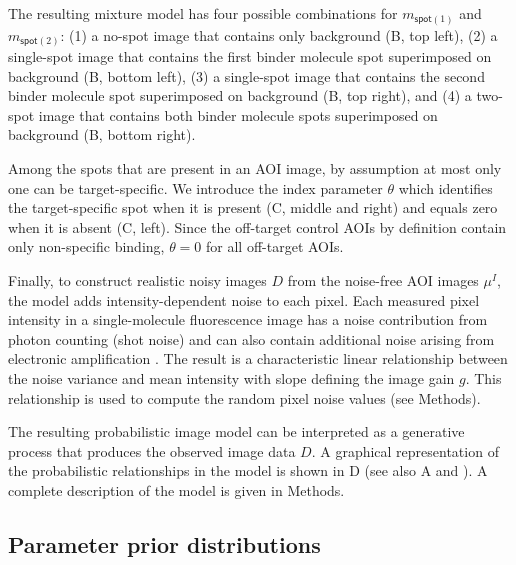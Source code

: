 The resulting mixture model has four possible combinations for $m_{\mathsf{spot}(1)}$ and $m_{\mathsf{spot}(2)}$: (1) a no-spot image that contains only background (B, top left), (2) a single-spot image that contains the first binder molecule spot superimposed on background (B, bottom left), (3) a single-spot image that contains the second binder molecule spot superimposed on background (B, top right), and (4) a two-spot image that contains both binder molecule spots superimposed on background (B, bottom right).

Among the spots that are present in an AOI image, by assumption at most only one can be target-specific. We introduce the index parameter $\theta$ which identifies the target-specific spot  when it is present (C, middle and right) and equals zero when it is absent (C, left). Since the off-target control AOIs by definition contain only non-specific binding, $\theta = 0$ for all off-target AOIs. 

Finally, to construct realistic noisy images $D$ from the noise-free AOI images $\mu^I$, the model adds intensity-dependent noise to each pixel.  Each measured pixel intensity in a single-molecule fluorescence image has a noise contribution from photon counting (shot noise) and can also contain additional noise arising from electronic amplification \citep{Van_Vliet1998-jk}. The result is a characteristic linear relationship between the noise variance and mean intensity with slope defining the image gain $g$. This relationship is used to compute the random pixel noise values (see Methods).

The resulting probabilistic image model can be interpreted as a generative process that produces the observed image data $D$. A graphical representation of the probabilistic relationships in the model is shown in D (see also A and ). A complete description of the model is given in Methods.  

\subsection{Parameter prior distributions}

